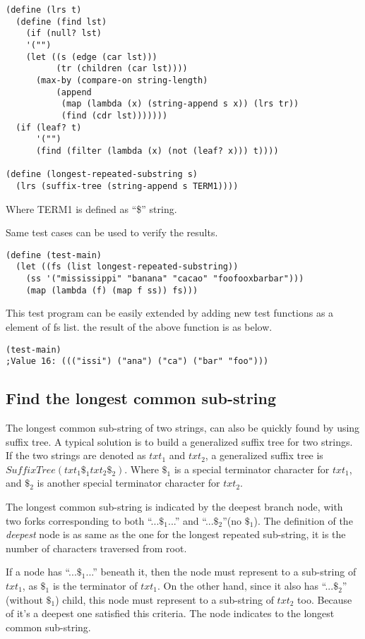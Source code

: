 \documentclass{article}
\begin{document}
\begin{lstlisting}
(define (lrs t)
  (define (find lst)
    (if (null? lst)
	'("")
	(let ((s (edge (car lst)))
	      (tr (children (car lst))))
	  (max-by (compare-on string-length) 
		  (append
		   (map (lambda (x) (string-append s x)) (lrs tr))
		   (find (cdr lst)))))))
  (if (leaf? t)
      '("")
      (find (filter (lambda (x) (not (leaf? x))) t))))

(define (longest-repeated-substring s)
  (lrs (suffix-tree (string-append s TERM1))))
\end{lstlisting}

Where TERM1 is defined as ``\$'' string.

Same test cases can be used to verify the results.

\begin{lstlisting}
(define (test-main)
  (let ((fs (list longest-repeated-substring)) 
	(ss '("mississippi" "banana" "cacao" "foofooxbarbar")))
    (map (lambda (f) (map f ss)) fs)))
\end{lstlisting}

This test program can be easily extended by adding new test
functions as a element of fs list. the result of the above
function is as below.

\begin{lstlisting}
(test-main) 
;Value 16: ((("issi") ("ana") ("ca") ("bar" "foo")))
\end{lstlisting}

\subsection{Find the longest common sub-string}
The longest common sub-string of two strings, can also be quickly found
by using suffix tree. A typical solution is to build a generalized suffix
tree for two strings. If the two strings are denoted as $txt_1$ and 
$txt_2$, a generalized suffix tree is $SuffixTree(txt_1\$_1txt_2\$_2)$.
Where $\$_1$ is a special terminator character for $txt_1$, and
$\$_2$ is another special terminator character for $txt_2$.

The longest common sub-string is indicated by the deepest branch node, with
two forks corresponding to both ``...$\$_1$...'' and ``...$\$_2$''(no $\$_1$).
The definition of the {\em deepest} node is as same as the one for 
the longest repeated sub-string, it is the number of characters traversed
from root. 

If a node has ``...$\$_1$...'' beneath it, then the node must represent
to a sub-string of $txt_1$, as $\$_1$ is the terminator of $txt_1$. 
On the other hand, since it also has ``...$\$_2$'' (without $\$_1$) child, this node 
must represent to a sub-string of $txt_2$ too. Because of it's a deepest
one satisfied this criteria. The node indicates to the longest common
sub-string.
\end{document}
